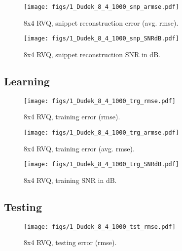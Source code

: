 								\begin{figure}[h!]
								\centering
								\texttt{[image: figs/1\_Dudek\_8\_4\_1000\_snp\_armse.pdf]}
								\caption{8x4 RVQ, snippet reconstruction error (avg. rmse).}
								\label{fig:1_Dudek_8_4_1000_snp_armse}
								\end{figure}

								\begin{figure}[h!]
								\centering
								\texttt{[image: figs/1\_Dudek\_8\_4\_1000\_snp\_SNRdB.pdf]}
								\caption{8x4 RVQ, snippet reconstruction SNR in dB.}
								\label{fig:1_Dudek_8_4_1000_snp_SNRdB}
								\end{figure}
\clearpage
\newpage
\subsection{Learning}
								\begin{figure}[h!]
								\centering
								\texttt{[image: figs/1\_Dudek\_8\_4\_1000\_trg\_rmse.pdf]}
								\caption{8x4 RVQ, training error (rmse).}
								\label{fig:1_Dudek_8_4_1000_trg_rmse}
								\end{figure}


								\begin{figure}[h!]
								\centering
								\texttt{[image: figs/1\_Dudek\_8\_4\_1000\_trg\_armse.pdf]}
								\caption{8x4 RVQ, training error (avg. rmse).}
								\label{fig:1_Dudek_8_4_1000_trg_armse}
								\end{figure}

								\begin{figure}[h!]
								\centering
								\texttt{[image: figs/1\_Dudek\_8\_4\_1000\_trg\_SNRdB.pdf]}
								\caption{8x4 RVQ, training SNR in dB.}
								\label{fig:1_Dudek_8_4_1000_trg_SNRdB}
								\end{figure}
\clearpage
\newpage
\subsection{Testing}
								\begin{figure}[h!]
								\centering
								\texttt{[image: figs/1\_Dudek\_8\_4\_1000\_tst\_rmse.pdf]}
								\caption{8x4 RVQ, testing error (rmse).}
								\label{fig:1_Dudek_8_4_1000_tst_rmse}
								\end{figure}


